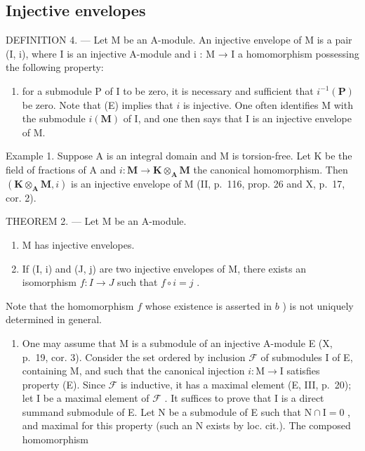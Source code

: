 \subsection{Injective envelopes}

DEFINITION 4. --- Let M be an A-module. An injective envelope of M is a pair (I, i), where I is an injective A-module and i : M → I a homomorphism possessing the following property:

\begin{enumerate}
\def\labelenumi{(\Alph{enumi})}
\setcounter{enumi}{4}
\tightlist
\item
  for a submodule P of I to be zero, it is necessary and sufficient that \(i^{-1}(\mathbf{P})\) be zero. Note that (E) implies that \(i\) is injective. One often identifies M with the submodule \(i(\mathbf{M})\) of I, and one then says that I is an injective envelope of M.
\end{enumerate}

Example 1. Suppose A is an integral domain and M is torsion-free. Let K be the field of fractions of A and \(i: \mathbf{M} \to \mathbf{K} \otimes_{\mathbf{A}} \mathbf{M}\) the canonical homomorphism. Then \((\mathbf{K} \otimes_{\mathbf{A}} \mathbf{M}, i)\) is an injective envelope of M (II, p.~116, prop. 26 and X, p.~17, cor. 2).

THEOREM 2. --- Let M be an A-module.

\begin{enumerate}
\def\labelenumi{\alph{enumi})}
\item
  M has injective envelopes.
\item
  If (I, i) and (J, j) are two injective envelopes of M, there exists an isomorphism \(f: I \to J\) such that \(f \circ i = j\) .
\end{enumerate}

Note that the homomorphism \(f\) whose existence is asserted in \(b\) ) is not uniquely determined in general.

\begin{enumerate}
\def\labelenumi{\alph{enumi})}
\tightlist
\item
  One may assume that M is a submodule of an injective A-module E (X, p.~19, cor. 3). Consider the set ordered by inclusion \(\mathcal{F}\) of submodules I of E, containing M, and such that the canonical injection \(i: \mathrm{M} \to \mathrm{I}\) satisfies property (E). Since \(\mathcal{F}\) is inductive, it has a maximal element (E, III, p.~20); let I be a maximal element of \(\mathcal{F}\) . It suffices to prove that I is a direct summand submodule of E. Let N be a submodule of E such that \(\mathrm{N} \cap \mathrm{I} = 0\) , and maximal for this property (such an N exists by loc. cit.). The composed homomorphism
\end{enumerate}

